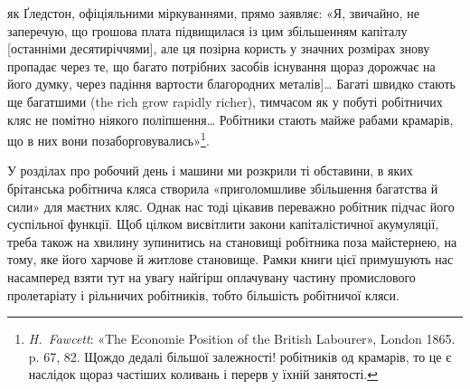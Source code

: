 як Ґледстон, офіціяльними міркуваннями, прямо заявляє:
«Я, звичайно, не заперечую, що грошова плата підвищилася із
цим збільшенням капіталу [останніми десятиріччями], але ця
позірна користь у значних розмірах знову пропадає через те,
що багато потрібних засобів існування щораз дорожчає на його
думку, через падіння вартости благородних металів]\dots{} Багаті
швидко стають ще багатшими (the rich grow rapidly richer),
тимчасом як у побуті робітничих кляс не помітно ніякого поліпшення\dots{}
Робітники стають майже рабами крамарів, що в них
вони позаборговувались»\footnote{
\emph{H.~Fawcett}: «The Economie Position of the British Labourer»,
London 1865. p. 67, 82. Щождо дедалі більшої залежності! робітників од
крамарів, то це є наслідок щораз частіших коливань і перерв у їхній
занятості.
}.

У розділах про робочий день і машини ми розкрили ті обставини,
в яких брітанська робітнича кляса створила «приголомшливе
збільшення багатства й сили» для маєтних кляс. Однак
нас тоді цікавив переважно робітник підчас його суспільної
функції. Щоб цілком висвітлити закони капіталістичної акумуляції,
треба також на хвилину зупинитись на становищі робітника
поза майстернею, на тому, яке його харчове й житлове становище.
Рамки книги цієї примушують нас насамперед взяти тут на увагу
найгірш оплачувану частину промислового пролетаріату і рільничих
робітників, тобто більшість робітничої кляси.
